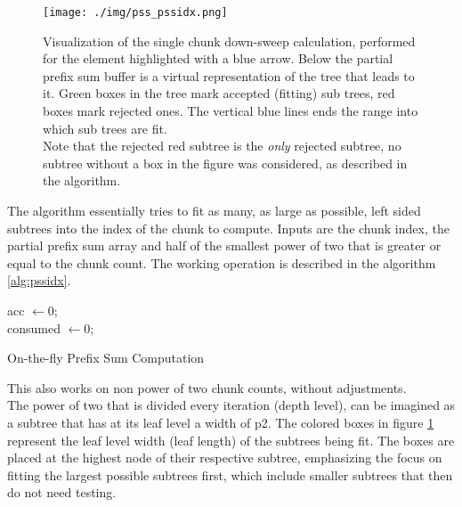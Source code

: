 \documentclass{tudscrreprt}
\begin{document}
				\begin{figure}[!ht]
					\centering
					\texttt{[image: ./img/pss\_pssidx.png]}
					\caption{\label{fig:pss_pssidx}Visualization of the single chunk down-sweep calculation, performed for the element highlighted with a blue arrow. Below the partial prefix sum buffer is a virtual representation of the tree that leads to it. Green boxes in the tree mark accepted (fitting) sub trees, red boxes mark rejected ones. The vertical blue lines ends the range into which sub trees are fit. \\ Note that the rejected red subtree is the \emph{only} rejected subtree, no subtree without a box in the figure was considered, as described in the algorithm.}
				\end{figure}
			
				The algorithm essentially tries to fit as many, as large as possible, left sided subtrees into the index of the chunk to compute. Inputs are the chunk index, the partial prefix sum array and half of the smallest power of two that is greater or equal to the chunk count. The working operation is described in the algorithm \ref{alg:pssidx}. \\
				
				\begin{algorithm}[!ht]
					\SetAlgoLined
					acc $\gets 0$; \\
					consumed $\gets 0$; \\
					\caption{\label{alg:pssidx}On-the-fly Prefix Sum Computation}
				\end{algorithm}
			
				This also works on non power of two chunk counts, without adjustments. \\
				The power of two that is divided every iteration (depth level), can be imagined as a subtree that has at its leaf level a width of p2. The colored boxes in figure \ref{fig:pss_pssidx} represent the leaf level width (leaf length) of the subtrees being fit. The boxes are placed at the highest node of their respective subtree, emphasizing the focus on fitting the largest possible subtrees first, which include smaller subtrees that then do not need testing. \\
			
\end{document}

